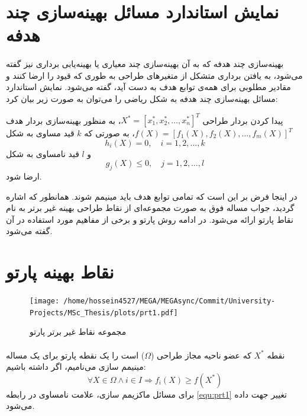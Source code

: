 \documentclass[a4paper,titlepage,12pt,fleqn,oneside]{report}
\begin{document}
	\section{نمایش استاندارد مسائل بهینه‌سازی چند هدفه}
	\paragraph{}
	بهینه‌سازی چند هدفه که به آن بهینه‌سازی چند معیاری یا بهینه‌یابی برداری نیز گفته می‌شود، به یافتن برداری متشکل از متغیر‌های طراحی به طوری که قیود را ارضا کنند و مقادیر مطلوبی برای همه‌ی توابع هدف به دست آید، گفته می‌شود. نمایش استاندارد مسائل بهینه‌سازی چند هدفه به شکل ریاضی را می‌توان به صورت زیر بیان کرد:
	
	پیدا کردن بردار طراحی $X^{*}=\left[x_{1}^{*}, x_{2}^{*}, \ldots, x_{n}^{*}\right]^{T}$، به منظور بهینه‌سازی بردار هدف $f(X)=\left[f_{1}(X), f_{2}(X), \ldots, f_{m}(X)\right]^{T}$، به صورتی که $k$ قید مساوی به شکل
	\begin{equation}
		\label{equ:se7}
		h_{i}(X)=0 , \quad i=1,2, \ldots, k
	\end{equation}
	و $l$ قید نامساوی به شکل
	\begin{equation}
		\label{equ:se8}
		g_{j}(X) \leq 0 , \quad j=1,2, \ldots, l
	\end{equation}
	ارضا شود.
	
	در اینجا فرض بر این است که تمامی توابع هدف باید مینیمم شوند. همانطور که اشاره گردید، جواب مساله فوق به صورت مجموعه‌ای از نقاط طراحی بهینه غیر برتر به نام نقاط پارتو ارائه می‌شود. در ادامه روش پارتو و برخی از مفاهیم مورد استفاده در آن گفته می‌شود.
	
	\section{نقاط بهینه پارتو}
	\begin{figure}[b!]
		\centering
		\texttt{[image: /home/hossein4527/MEGA/MEGAsync/Commit/University-Projects/MSc\_Thesis/plots/prt1.pdf]}
		\caption{مجموعه نقاط غیر برتر پارتو}
		\label{fig:prt1}
	\end{figure}
	\paragraph{}
	نقطه $X^{*}$ که عضو ناحیه مجاز طراحی ($\Omega$) است را یک نقطه پارتو برای یک مساله مینیمم سازی می‌نامیم، اگر داشته باشیم:
	\begin{equation}
		\label{equ:prt1}
		\forall X \in \Omega \wedge i \in I \Rightarrow f_{i}(X) \geq f\left(X^{*}\right)
	\end{equation}
	برای مسائل ماکزیمم سازی، علامت نامساوی در رابطه \ref{equ:prt1} تغییر جهت داده می‌شود.
	
\end{document}
